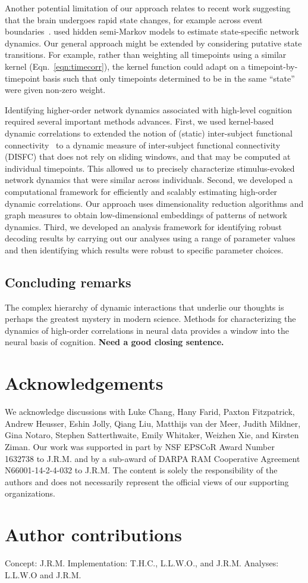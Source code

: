 \documentclass[english]{article}
\begin{document}
Another potential limitation of our approach relates to recent work
suggesting that the brain undergoes rapid state changes, for example
across event boundaries~\citep[e.g., ][]{BaldEtal17}.
\cite{ShapEtal19} used hidden semi-Markov models to estimate
state-specific network dynamics.  Our general approach might be
extended by considering putative state transitions. For example,
rather than weighting all timepoints using a similar kernel
(Eqn.~\ref{eqn:timecorr}), the kernel function could adapt on a
timepoint-by-timepoint basis such that only timepoints determined to
be in the same ``state'' were given non-zero weight.

Identifying higher-order network dynamics associated with high-level
cognition required several important methods advances.  First, we used
kernel-based dynamic correlations to extended the notion of (static)
inter-subject functional connectivity~\citep{SimoEtal16} to a dynamic
measure of inter-subject functional connectivity (DISFC) that does not
rely on sliding windows, and that may be computed at individual
timepoints.  This allowed us to precisely characterize stimulus-evoked
network dynamics that were similar across individuals.  Second, we
developed a computational framework for efficiently and scalably estimating
high-order dynamic correlations.  Our approach uses dimensionality
reduction algorithms and graph measures to obtain low-dimensional
embeddings of patterns of network dynamics.  Third, we developed an
analysis framework for identifying robust decoding results by carrying
out our analyses using a range of parameter values and then
identifying which results were robust to specific parameter choices.

\subsection*{Concluding remarks}
The complex hierarchy of dynamic interactions that underlie our
thoughts is perhaps the greatest mystery in modern science.  Methods
for characterizing the dynamics of high-order correlations in neural
data provides a window into the neural basis of cognition.
\textbf{Need a good closing sentence.}


\section*{Acknowledgements}
We acknowledge discussions with Luke Chang, Hany Farid, Paxton
Fitzpatrick, Andrew Heusser, Eshin Jolly, Qiang Liu, Matthijs van der
Meer, Judith Mildner, Gina Notaro, Stephen Satterthwaite, Emily
Whitaker, Weizhen Xie, and Kirsten Ziman. Our work was supported in
part by NSF EPSCoR Award Number 1632738 to J.R.M. and by a sub-award
of DARPA RAM Cooperative Agreement N66001-14-2-4-032 to J.R.M.  The
content is solely the responsibility of the authors and does not
necessarily represent the official views of our supporting
organizations.

\section*{Author contributions}
Concept: J.R.M.  Implementation: T.H.C., L.L.W.O., and
J.R.M.  Analyses: L.L.W.O and J.R.M.



\end{document}
